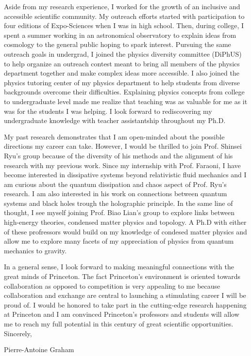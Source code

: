 \documentclass[12pt]{article}
\begin{document}
Aside from my research experience, I worked for the growth of an inclusive and accessible scientific community. My outreach efforts started with participation to four editions of Expo-Sciences when I was in high school. Then, during college, I spent a summer working in an astronomical observatory to explain ideas from cosmology to the general public hoping to spark interest. Pursuing the same outreach goals in undergrad, I joined the physics diversity committee (DiPhUS) to help organize an outreach contest meant to bring all members of the physics department together and make complex ideas more accessible. I also joined the physics tutoring center of my physics department to help students from diverse backgrounds overcome their difficulties. Explaining physics concepts from college to undergraduate level made me realize that teaching was as valuable for me as it was for the students I was helping. I look forward to rediscovering my undergraduate knowledge with teacher assistantship throughout my Ph.D.  

\vspace{0.4cm}

My past research demonstrates that I am open-minded about the possible directions my career can take. However, I would be thrilled to join Prof. Shinsei Ryu's group because of the diversity of his methods and the alignment of his research with my previous work. Since my internship with Prof. Faraoni, I have become interested in dissipative systems beyond relativistic fluid mechanics and I am curious about the quantum dissipation and chaos aspect of Prof. Ryu's research. I am also interested in his work on connections between quantum systems and black holes trough the holographic principle. In the same line of thought, I see myself joining Prof. Biao Lian's group to explore links between high-energy theories, condensed matter physics and topology. A Ph.D with either of these profressors would build on my knowledge of condesed matter physics and allow me to explore many facets of my appreciation of physics from quantum mechanics to gravity. 

\vspace{0.4cm}

In a general sense, I look forward to making meaningful connections with the great minds of Princeton. The fact Princeton's environment is oriented towards collaboration as opposed to competition is very appealing to me because collaboration and exchange are central to launching a stimulating career I will be proud of. I would be honored to take part in the cutting-edge research happening at Princeton and I am convinced Princeton's professors and students will allow me to reach my full potential in this century of great scientific opportunities.\\

Sincerely,

\vspace{0.4cm}
Pierre-Antoine Graham
\end{document}
